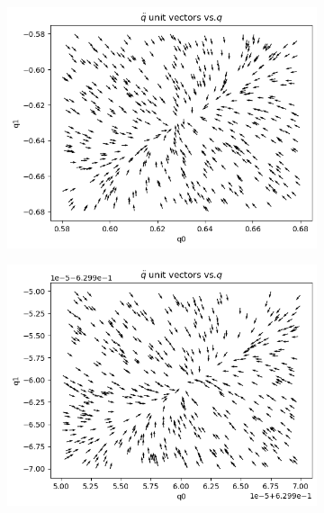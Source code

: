 \documentclass[]{article}
\begin{document}
\begin{appendices}
\begin{figure}[H]
	\caption{Comparison of sampling near a fixed point for a large range of sampling area sizes}
	\begin{subfigure}{.5\textwidth}
		\centering
		\includegraphics[scale=0.40]{2d-sampling-fixed-point-partial.png}
		\label{subfig:sampling-fixed-point}
	\end{subfigure}
	\begin{subfigure}{.5\textwidth}
		\centering
		\includegraphics[scale=0.40]{2d-sampling-fixed-point-close-partial.png}
		\label{subfig:sampling-fixed-point-close}
	\end{subfigure}
	\label{fig:sampling-fixed-point}
\end{figure}


\end{appendices}
\end{document}
